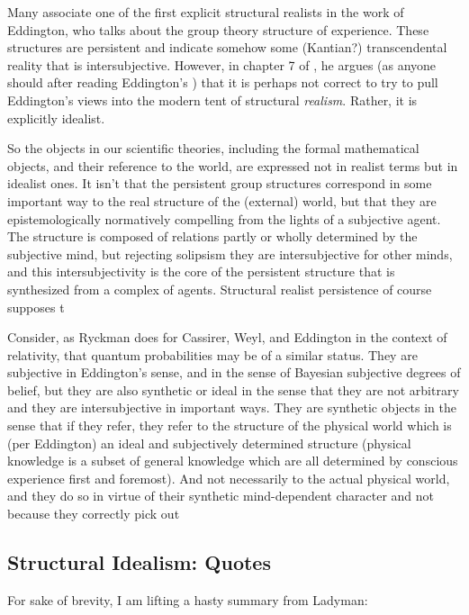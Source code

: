 \documentclass{article}
\begin{document}
Many associate one of the first explicit structural realists in the work of Eddington, who talks about the group theory structure of experience.  These structures are persistent and indicate somehow some  (Kantian?) transcendental reality that is intersubjective.  However, in chapter 7 of \cite{Ryckman2005}, he argues (as anyone should after reading Eddington's \cite{Eddington1939}) that it is perhaps not correct to try to pull Eddington's views into the modern tent of structural \emph{realism}.  Rather, it is explicitly idealist.  

So the objects in our scientific theories, including the formal mathematical objects, and their reference to the world, are expressed not in realist terms but in idealist ones.  It isn't that the persistent group structures correspond in some important way to the real structure of the (external) world, but that they are epistemologically normatively compelling from the lights of a subjective agent.  The structure is composed of relations partly or wholly determined by the subjective mind, but rejecting solipsism they are intersubjective for other minds, and this intersubjectivity is the core of the persistent structure that is synthesized from a complex of agents.  Structural realist persistence of course supposes t



Consider, as Ryckman does for Cassirer, Weyl, and Eddington in the context of relativity, that quantum probabilities may be of a similar status.  They are subjective in Eddington's sense, and in the sense of Bayesian subjective degrees of belief, but they are also synthetic or ideal in the sense that they are not arbitrary and they are intersubjective in important ways.  They are synthetic objects in the sense that if they refer, they refer to the structure of the physical world which is (per Eddington) an ideal and subjectively determined structure (physical knowledge is a subset of general knowledge which are all determined by conscious experience first and foremost).  And not necessarily to the actual physical world, and they do so in virtue of their synthetic mind-dependent character and not because they correctly pick out 





\subsection{Structural Idealism: Quotes}

For sake of brevity, I am lifting a hasty summary from Ladyman:
\end{document}
